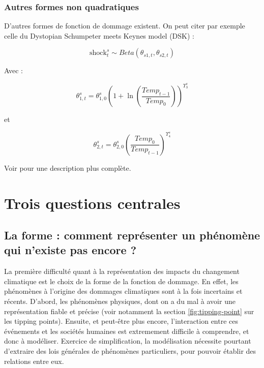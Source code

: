 \subsubsection{Autres formes non quadratiques}

D'autres formes de fonction de dommage existent. On peut citer par exemple celle du Dystopian Schumpeter meets Keynes model (DSK) : 

\begin{equation}
    \text{shock}^s_t \sim Beta(\theta_{s1,t}, \theta_{s2,t})
    \label{eq:DSK1}
\end{equation}

Avec : 

\begin{equation}
   \theta_{1,t}^s = \theta_{1,0}^s (1 + \ln \left( \frac{Temp_{t-1}}{Temp_0} \right))^{\Upsilon_{3}^s}
    \label{eq:DSK2}
\end{equation}

et 

\begin{equation}
   \theta_{2,t}^s = \theta_{2,0}^s \left( \frac{Temp_0}{Temp_{t-1}} \right)^{\Upsilon_{4}^s} 
    \label{eq:DSK2}
\end{equation}

Voir \cite{reissl_dsk-sfc_2024} pour une description plus complète. 
 
\section{Trois questions centrales}


\subsection{La forme : comment représenter un phénomène qui n'existe pas encore ?}
\label{ss:forme}

La première difficulté quant à la représentation des impacts du changement climatique est le choix de la forme de la fonction de dommage. En effet, les phénomènes à l'origine des dommages climatiques sont à la fois incertains et récents. D'abord, les phénomènes physiques, dont on a du mal à avoir une représentation fiable et précise (voir notamment la section \ref{fig:tipping-point} sur les tipping points). Ensuite, et peut-être plus encore, l'interaction entre ces événements et les sociétés humaines est extremement difficile à comprendre, et donc à modéliser. Exercice de simplification, la modélisation nécessite pourtant d'extraire des lois générales de phénomènes particuliers, pour pouvoir établir des relations entre eux. \\

